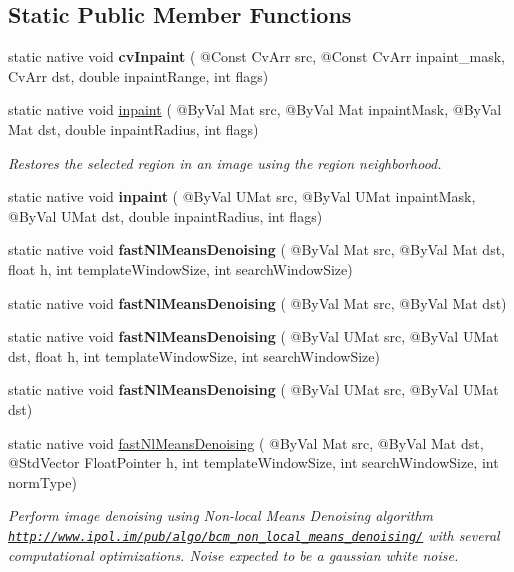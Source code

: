 \subsection*{Static Public Member Functions}
\begin{DoxyCompactItemize}
\item 
static native void {\bfseries cv\+Inpaint} ( @Const Cv\+Arr src, @Const Cv\+Arr inpaint\+\_\+mask, Cv\+Arr dst, double inpaint\+Range, int flags)
\item 
static native void \hyperlink{group__photo_gac642f4ae1eabdce5624c07d7202b0a3e}{inpaint} ( @By\+Val Mat src, @By\+Val Mat inpaint\+Mask, @By\+Val Mat dst, double inpaint\+Radius, int flags)
\begin{DoxyCompactList}\small\item\em Restores the selected region in an image using the region neighborhood. \end{DoxyCompactList}\item 
static native void {\bfseries inpaint} ( @By\+Val U\+Mat src, @By\+Val U\+Mat inpaint\+Mask, @By\+Val U\+Mat dst, double inpaint\+Radius, int flags)
\item 
static native void {\bfseries fast\+Nl\+Means\+Denoising} ( @By\+Val Mat src, @By\+Val Mat dst, float h, int template\+Window\+Size, int search\+Window\+Size)
\item 
static native void {\bfseries fast\+Nl\+Means\+Denoising} ( @By\+Val Mat src, @By\+Val Mat dst)
\item 
static native void {\bfseries fast\+Nl\+Means\+Denoising} ( @By\+Val U\+Mat src, @By\+Val U\+Mat dst, float h, int template\+Window\+Size, int search\+Window\+Size)
\item 
static native void {\bfseries fast\+Nl\+Means\+Denoising} ( @By\+Val U\+Mat src, @By\+Val U\+Mat dst)
\item 
static native void \hyperlink{group__photo__denoise_gac9dd83e0192eaed8ea6aad42f98b138b}{fast\+Nl\+Means\+Denoising} ( @By\+Val Mat src, @By\+Val Mat dst, @Std\+Vector Float\+Pointer h, int template\+Window\+Size, int search\+Window\+Size, int norm\+Type)
\begin{DoxyCompactList}\small\item\em Perform image denoising using Non-\/local Means Denoising algorithm \href{http://www.ipol.im/pub/algo/bcm_non_local_means_denoising/}{\tt http\+://www.\+ipol.\+im/pub/algo/bcm\+\_\+non\+\_\+local\+\_\+means\+\_\+denoising/} with several computational optimizations. Noise expected to be a gaussian white noise. \end{DoxyCompactList}\item 

\end{DoxyCompactItemize}
